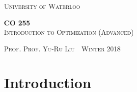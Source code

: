 \documentclass[11pt]{article}
\newcommand{\thiscoursecode}{CO 255}
\newcommand{\thiscoursename}{Introduction to Optimization (Advanced)}
\newcommand{\thisprof}{Prof. Yu-Ru Liu}
\newcommand{\thisterm}{Winter 2018}
\begin{document}
\begin{titlepage}
\begin{centering}
{\scshape\LARGE University of Waterloo \par}
\globe
{\huge\bf \thiscoursecode}\\
{\scshape\Large \thiscoursename}\\
\vspace{.3cm}
{\scshape Prof. \thisprof~\textbullet~\thisterm\par}
\end{centering}
\sectionline
\tableofcontents
\sectionline
\thispagestyle{empty}
\end{titlepage}

\section{Introduction}
\end{document}
